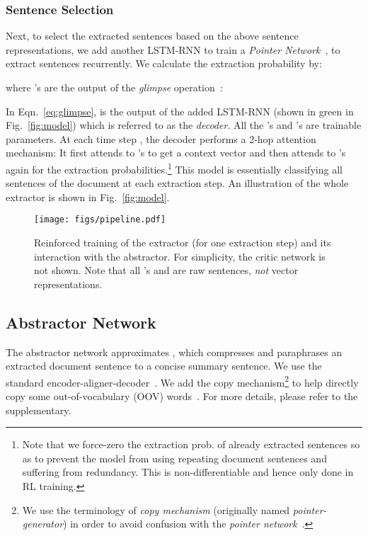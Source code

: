 \documentclass[11pt,a4paper]{article}
\def\figref#1{Fig.~\ref{#1}}
\def\eqnref#1{Eqn.~\ref{#1}}
\begin{document}
\subsubsection{Sentence Selection}\label{subsec:sent_select}

Next, to select the extracted sentences based on the above sentence representations, 
we add another LSTM-RNN to train a \textit{Pointer Network}~\citep{NIPS2015_5866:pointer_networks},
to extract sentences recurrently.
We calculate the extraction probability by:
\vspace{-5pt}

\vspace{-5pt}

where 's are the output of the \textit{glimpse} operation~\cite{OrderMatters}:
\vspace{-3pt}

In \eqnref{eq:glimpse},  is the output of the added LSTM-RNN (shown in green in \figref{fig:model}) which is 
referred to as the \textit{decoder}.
All the 's and 's are trainable parameters.
At each time step , the decoder performs a 2-hop attention mechanism:
It first attends to 's to get a context vector  and then attends to 's again for the extraction probabilities.\footnote{Note that we force-zero the extraction prob. of already extracted sentences so as to prevent the model from using repeating document sentences and suffering from redundancy. This is non-differentiable and hence only done in RL training.}
This model is essentially classifying all sentences of the document at each extraction step.
An illustration of the whole extractor is shown in \figref{fig:model}.

\begin{figure}
 \centering
 \texttt{[image: figs/pipeline.pdf]}
 \vspace{-0.9cm}
 \caption{
 Reinforced training of the extractor (for one extraction step) and its interaction with the abstractor.
 For simplicity, the critic network is not shown.
 Note that all 's and  are raw sentences, \emph{not} vector representations.
 }
 \vspace{-0.2cm}
 \label{fig:pipeline}
\end{figure}


\subsection{Abstractor Network}
\label{sec:abs}
The abstractor network approximates , 
which compresses and paraphrases an extracted document sentence to a concise summary sentence.
We use the standard encoder-aligner-decoder~\cite{bahdanau+al-2014-nmt,luong-pham-manning:2015:EMNLP}. We add the copy mechanism\footnote{We use the terminology of \textit{copy mechanism} (originally named 
\textit{pointer-generator}) in order to avoid confusion with the \textit{pointer network}~\cite{NIPS2015_5866:pointer_networks}.}
to help directly copy some out-of-vocabulary (OOV) words~\cite{get_to_the_point}.
For more details, please refer to the supplementary.
\end{document}
